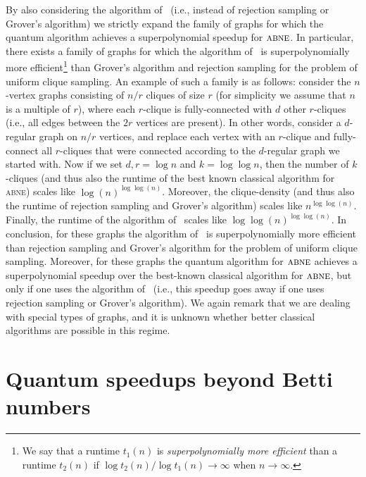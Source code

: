 \documentclass[a4paper, onecolumn, accepted=2022-08-28]{quantumarticle}
\begin{document}
By also considering the algorithm of~\cite{eden:clique}  (i.e., instead of rejection sampling or Grover's algorithm) we strictly expand the family of graphs for which the quantum algorithm achieves a superpolynomial speedup for $\textsc{abne}$.  
In particular, there exists a family of graphs for which the algorithm of~\cite{eden:clique} is superpolynomially more efficient\footnote{We say that a runtime $t_1(n)$ is \emph{superpolynomially more efficient} than a runtime $t_2(n)$ if $\log t_2(n)/\log t_1(n) \rightarrow \infty$ when $n \rightarrow \infty$.} than Grover's algorithm and rejection sampling for the problem of uniform clique sampling.
An example of such a family is as follows:
consider the $n$-vertex graphs consisting of $n/r$ cliques of size $r$ (for simplicity we assume that $n$ is a multiple of $r$), where each $r$-clique is fully-connected with $d$ other $r$-cliques (i.e., all edges between the $2r$ vertices are present).
In other words, consider a $d$-regular graph on $n/r$ vertices, and replace each vertex with an $r$-clique and fully-connect all $r$-cliques that were connected according to the $d$-regular graph we started with. 
Now if we set $d, r = \log n$ and $k = \log\log n$, then the number of $k$-cliques (and thus also the runtime of the best known classical algorithm for \textsc{abne}) scales like $\log(n)^{\log\log(n)}$.
Moreover, the clique-density (and thus also the runtime of rejection sampling and Grover's algorithm) scales like $n^{\log\log(n)}$.
Finally, the runtime of the algorithm of~\cite{eden:clique} scales like $\log\log(n)^{\log\log(n)}$.
In conclusion, for these graphs the algorithm of~\cite{eden:clique} is superpolynomially more efficient than rejection sampling and Grover's algorithm for the problem of uniform clique sampling.
Moreover, for these graphs the quantum algorithm for $\textsc{abne}$ achieves a superpolynomial speedup over the best-known classical algorithm for $\textsc{abne}$, but only if one uses the algorithm of~\cite{eden:clique} (i.e., this speedup goes away if one uses rejection sampling or Grover's algorithm).
We again remark that we are dealing with special types of graphs, and it is unknown whether better classical algorithms are possible in this regime.

\section{Quantum speedups beyond Betti numbers
  \label{sec:beyond_betti}}
\end{document}
